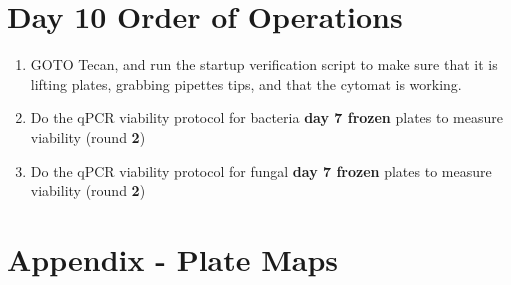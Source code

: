 \documentclass{article}
\begin{document}
\section*{Day 10 Order of Operations} \label{day8instructions}
\begin{enumerate}
    \item GOTO Tecan, and run the startup verification script to make sure that it is lifting plates, grabbing pipettes tips, and that the cytomat is working. 
    \item Do the qPCR viability protocol for bacteria \textbf{day 7 frozen} plates to measure viability (round \textbf{2})
    \item Do the qPCR viability protocol for fungal \textbf{day 7 frozen} plates to measure viability (round \textbf{2})
\end{enumerate}


\section*{Appendix - Plate Maps} \label{platemaps}
\end{document}
